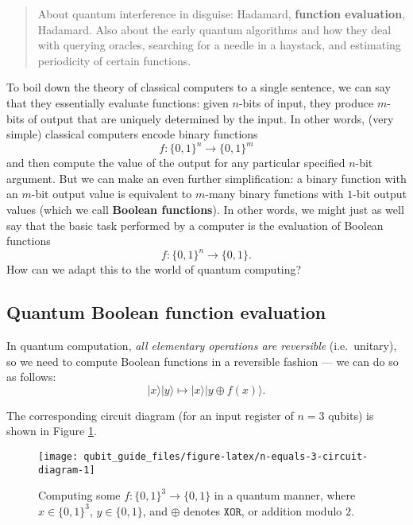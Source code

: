 \documentclass[fleqn]{article}
\begin{document}
\begin{quote}
About quantum interference in disguise: Hadamard, \textbf{function evaluation}, Hadamard.
Also about the early quantum algorithms and how they deal with querying oracles, searching for a needle in a haystack, and estimating periodicity of certain functions.
\end{quote}

To boil down the theory of classical computers to a single sentence, we can say that they essentially evaluate functions: given \(n\)-bits of input, they produce \(m\)-bits of output that are uniquely determined by the input.
In other words, (very simple) classical computers encode binary functions
\[
  f\colon \{0,1\}^n \to \{0,1\}^m
\]
and then compute the value of the output for any particular specified \(n\)-bit argument.
But we can make an even further simplification: a binary function with an \(m\)-bit output value is equivalent to \(m\)-many binary functions with \(1\)-bit output values (which we call \textbf{Boolean functions}).
In other words, we might just as well say that the basic task performed by a computer is the evaluation of Boolean functions
\[
  f\colon \{0,1\}^n \to  \{0,1\}.
\]
How can we adapt this to the world of quantum computing?

\hypertarget{quantum-boolean-function-evaluation}{%
\subsection{Quantum Boolean function evaluation}\label{quantum-boolean-function-evaluation}}

In quantum computation, \emph{all elementary operations are reversible} (i.e.~unitary), so we need to compute Boolean functions in a reversible fashion --- we can do so as follows:
\[
  |x\rangle|y\rangle \mapsto |x\rangle|y\oplus f(x)\rangle.
\]

The corresponding circuit diagram (for an input register of \(n=3\) qubits) is shown in Figure \ref{fig:n-equals-3-circuit-diagram}.



\begin{figure}[H]

{\centering \texttt{[image: qubit\_guide\_files/figure-latex/n-equals-3-circuit-diagram-1]} 

}

\caption{Computing some \(f\colon\{0,1\}^3\to\{0,1\}\) in a quantum manner, where \(x\in\{0,1\}^3\), \(y\in\{0,1\}\), and \(\oplus\) denotes \(\texttt{XOR}\), or addition modulo \(2\).}\label{fig:n-equals-3-circuit-diagram}
\end{figure}
\end{document}
